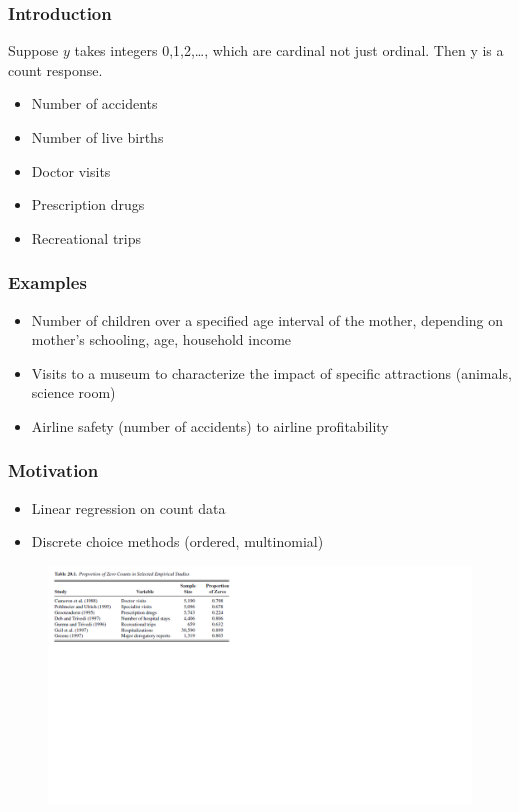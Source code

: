\documentclass{beamer}
\newcommand{\1}{\mathbb{1}}
\begin{document}
\begin{frame}\frametitle{Introduction}
Suppose $y$ takes integers 0,1,2,\ldots, which are cardinal not just ordinal. Then y is a count response. 
\begin{itemize}
\item Number of accidents
\item Number of live births
\item Doctor visits
\item Prescription drugs
\item Recreational trips
\end{itemize}
\end{frame}

\begin{frame}\frametitle{Examples}
\begin{itemize}
\item Number of children over a specified age interval of the mother, depending on mother's schooling, age, household income 
\item Visits to a museum to characterize the impact of specific attractions (animals, science room)
\item Airline safety (number of accidents) to airline profitability
\end{itemize}
\end{frame}

\begin{frame}\frametitle{Motivation}
\begin{itemize}
\item Linear regression on count data
\item Discrete choice methods (ordered, multinomial)
\end{itemize}
\begin{figure}
\includegraphics[width = 25cm]{plot/zero}
\end{figure}
\end{frame}
\end{document}
